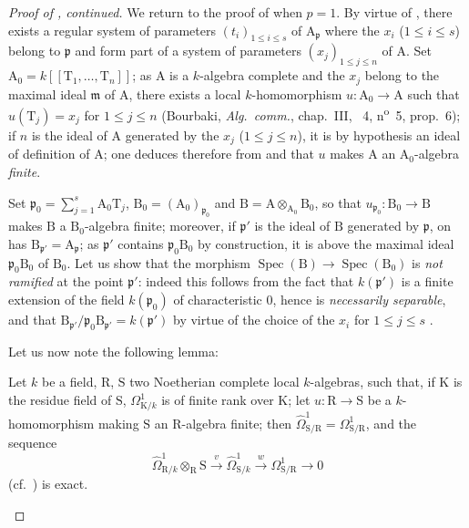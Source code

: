 \begin{proof}[Proof of {}, continued]
We return to the proof of  when $p=1$.
By virtue of , there exists a regular system of parameters $(t_i)_{1\leq i\leq s}$ of $\mathrm{A}_\mathfrak{p}$ where the $x_i$ ($1\leq i\leq s$) belong to $\mathfrak{p}$ and form part of a system of parameters $(x_j)_{1\leq j\leq n}$ of $\mathrm{A}$.
Set $\mathrm{A}_0=k[[\mathrm{T}_1,\ldots,\mathrm{T}_n]]$; as $\mathrm{A}$ is a $k$-algebra complete and the $x_j$ belong to the maximal ideal $\mathfrak{m}$ of $\mathrm{A}$, there exists a local $k$-homomorphism $u:\mathrm{A}_0\to\mathrm{A}$ such that $u(\mathrm{T}_j)=x_j$ for $1\leq j\leq n$ (Bourbaki, \emph{Alg.\ comm.}, chap.~III, \textsection~4, n\textsuperscript{o}~5, prop.~6); if $n$ is the ideal of $\mathrm{A}$ generated by the $x_j$ ($1\leq j\leq n$), it is by hypothesis an ideal of definition of $\mathrm{A}$; one deduces therefore from  and  that $u$ makes $\mathrm{A}$ an $\mathrm{A}_0$-algebra \emph{finite}.

Set $\mathfrak{p}_0=\sum_{j=1}^{s}\mathrm{A}_0\mathrm{T}_j$, $\mathrm{B}_0=(\mathrm{A}_0)_{\mathfrak{p}_0}$ and $\mathrm{B}=\mathrm{A}\otimes_{\mathrm{A}_0}\mathrm{B}_0$, so that $u_{\mathfrak{p}_0}:\mathrm{B}_0\to\mathrm{B}$ makes
$\mathrm{B}$ a $\mathrm{B}_0$-algebra finite; moreover, if $\mathfrak{p}'$ is the ideal of $\mathrm{B}$ generated by $\mathfrak{p}$, on has $\mathrm{B}_{\mathfrak{p}'}=\mathrm{A}_\mathfrak{p}$; as $\mathfrak{p}'$ contains $\mathfrak{p}_0\mathrm{B}_0$ by construction, it is above the maximal ideal $\mathfrak{p}_0\mathrm{B}_0$ of $\mathrm{B}_0$.
Let us show that the morphism $\operatorname{Spec}(\mathrm{B})\to\operatorname{Spec}(\mathrm{B}_0)$ is \emph{not ramified} at the point $\mathfrak{p}'$: indeed this follows from the fact that $k(\mathfrak{p}')$ is a finite extension of the field $k(\mathfrak{p}_0)$ of characteristic $0$, hence is \emph{necessarily separable}, and that $\mathrm{B}_{\mathfrak{p}'}/\mathfrak{p}_0\mathrm{B}_{\mathfrak{p}'}=k(\mathfrak{p}')$ by virtue of the choice of the $x_i$ for $1\leq j\leq s$ .

Let us now note the following lemma:

\begin{lemma}[18.11.3.5]
\label{IV.18.11.3.5}
Let $k$ be a field, $\mathrm{R}$, $\mathrm{S}$ two Noetherian complete local $k$-algebras, such that, if $\mathrm{K}$ is the residue field of $\mathrm{S}$, $\Omega^1_{\mathrm{K}/k}$ is of finite rank over $\mathrm{K}$; let $u:\mathrm{R}\to\mathrm{S}$ be a $k$-homomorphism making $\mathrm{S}$ an $\mathrm{R}$-algebra finite; then $\hat{\Omega}^1_{\mathrm{S}/\mathrm{R}}=\Omega^1_{\mathrm{S}/\mathrm{R}}$, and the sequence
\begin{equation}
\label{IV.18.11.3.6}
\tag{18.11.3.6}
  \hat{\Omega}^1_{\mathrm{R}/k}\otimes_{\mathrm{R}}\mathrm{S}\xrightarrow{v}\hat{\Omega}^1_{\mathrm{S}/k}\xrightarrow{w}\Omega^1_{\mathrm{S}/\mathrm{R}}\to 0
\end{equation}
(cf.\ ) is exact.
\end{lemma}


\end{proof}
